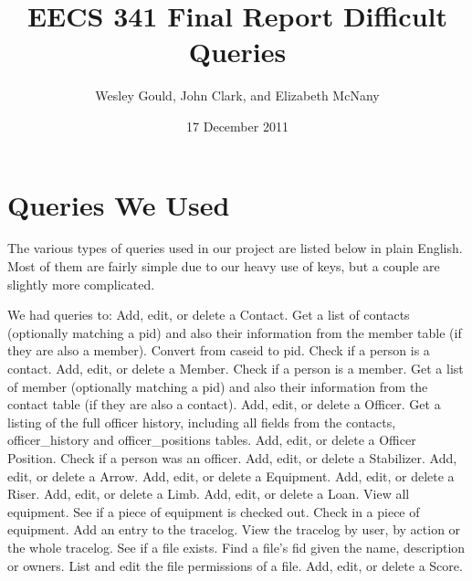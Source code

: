 \documentclass{article}
\author{Wesley Gould, John Clark, and Elizabeth McNany}
\date{17 December 2011}
\title{EECS 341 Final Report Difficult Queries}
\begin{document}
\maketitle

\section{Queries We Used}

The various types of queries used in our project are listed below in plain English.  Most of them are fairly simple due to our heavy use of keys, but a couple are slightly more complicated.

We had queries to: \newline
Add, edit, or delete a Contact.  \newline
Get a list of contacts (optionally matching a pid) and also their information from the member table (if they are also a member). \newline
Convert from caseid to pid. \newline
Check if a person is a contact. \newline
Add, edit, or delete a Member. \newline
Check if a person is a member.  \newline
Get a list of member (optionally matching a pid) and also their information from the contact table (if they are also a contact). \newline
Add, edit, or delete a Officer.  \newline
Get a listing of the full officer history, including all fields from the contacts, officer\_history and officer\_positions tables. \newline
Add, edit, or delete a Officer Position. \newline
Check if a person was an officer. \newline
Add, edit, or delete a Stabilizer. \newline
Add, edit, or delete a Arrow. \newline
Add, edit, or delete a Equipment. \newline
Add, edit, or delete a Riser. \newline
Add, edit, or delete a Limb. \newline
Add, edit, or delete a Loan. \newline
View all equipment. \newline
See if a piece of equipment is checked out. \newline
Check in a piece of equipment. \newline
Add an entry to the tracelog. \newline
View the tracelog by user, by action or the whole tracelog. \newline
See if a file exists. \newline
Find a file's fid given the name, description or owners. \newline
List and edit the file permissions of a file. \newline
Add, edit, or delete a Score. \newline
\end{document}
